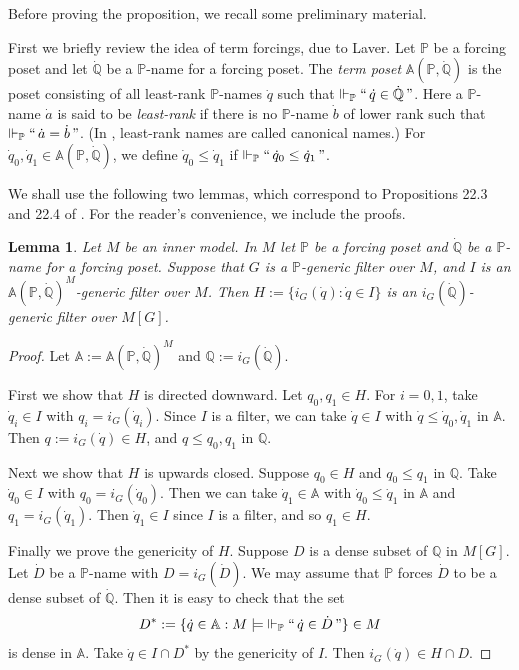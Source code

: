 \documentclass[a4paper,12pt,reqno,oneside]{amsart}
\theoremstyle{plain}
\newtheorem{lemma}[theorem]{Lemma}
\newcommand{\mbb}{\mathbb}
\begin{document}
Before proving the proposition, we recall some preliminary material.

First we briefly review the idea of term forcings, due to Laver. Let $\mbb{P}$ be a forcing poset and let $\dot{\mbb{Q}}$ be a $\mbb{P}$-name for a forcing poset. The \emph{term poset} $\mbb{A} ( \mbb{P} , \dot{\mbb{Q}} )$ is the poset consisting of all least-rank $\mbb{P}$-names $\dot{q}$ such that $\Vdash_\mbb{P} ``\, \dot{q} \in \dot{\mbb{Q}}\,"$. Here a $\mbb{P}$-name $\dot{a}$ is said to be \emph{least-rank} if there is no $\mbb{P}$-name $\dot{b}$ of lower rank such that $\Vdash_\mbb{P} ``\, \dot{a} = \dot{b} \, "$. (In \cite{C}, least-rank names are called canonical names.) For $\dot{q}_0,\dot{q}_1\in\mbb{A} ( \mbb{P} , \dot{\mbb{Q}} )$, we define $\dot{q}_0 \leq \dot{q}_1$ if $\Vdash_\mbb{P} ``\,\dot{q}_0 \leq \dot{q}_1 \, "$.


We shall use the following two lemmas, which correspond to Propositions 22.3 and 22.4 of \cite{C}. For the reader's convenience, we include the proofs.

\begin{lemma}\label{lem:term_basic}
Let $M$ be an inner model. In $M$ let $\mbb{P}$ be a forcing poset and $\dot{\mbb{Q}}$ be a $\mbb{P}$-name for a forcing poset. Suppose that $G$ is a $\mbb{P}$-generic filter over $M$, and $I$ is an $\mbb{A} (\mbb{P},\dot{\mbb{Q}})^M$-generic filter over $M$. Then $H := \{i_G (\dot{q}) : \dot{q} \in I \}$ is an $i_G (\dot{\mbb{Q}})$-generic filter over $M[G]$.
\end{lemma}


\begin{proof}
Let $\mbb{A} := \mbb{A} ( \mbb{P} , \dot{\mbb{Q}} )^M$ and $\mbb{Q} := i_G ( \dot{\mbb{Q}} )$.

First we show that $H$ is directed downward. Let $q_0 , q_1 \in H$. For $i = 0,1$, take $\dot{q}_i \in I$ with $q_i = i_G ( \dot{q}_i )$. Since $I$ is a filter, we can take $\dot{q} \in I$ with $\dot{q} \leq \dot{q}_0 , \dot{q}_1$ in $\mbb{A}$. Then $q := i_G ( \dot{q} ) \in H$, and $q \leq q_0 , q_1$ in $\mbb{Q}$.

Next we show that $H$ is upwards closed. Suppose $q_0 \in H$ and $q_0 \leq q_1$ in $\mbb{Q}$. Take $\dot{q}_0 \in I$ with $q_0 = i_G ( \dot{q}_0 )$. Then we can take $\dot{q}_1 \in \mbb{A}$ with $\dot{q}_0 \leq \dot{q}_1$ in $\mbb{A}$ and $q_1 = i_G ( \dot{q}_1 )$. Then $\dot{q}_1 \in I$ since $I$ is a filter, and so $q_1 \in H$.

Finally we prove the genericity of $H$. Suppose $D$ is a dense subset of $\mbb{Q}$ in $M[G]$. Let $\dot{D}$ be a $\mbb{P}$-name with $D = i_G ( \dot{D} )$. We may assume that $\mbb{P}$ forces $\dot{D}$ to be a dense subset of $\dot{\mbb{Q}}$. Then it is easy to check that the set
\[
D^* := \{ \dot{q} \in \mbb{A} : M \models \; \Vdash_{\mbb{P}} ``\, \dot{q} \in \dot{D} \," \} \in M
\]
is dense in $\mbb{A}$. Take $\dot{q} \in I \cap D^*$ by the genericity of $I$. Then $i_G ( \dot{q} ) \in H \cap D$.
\end{proof}
\end{document}
